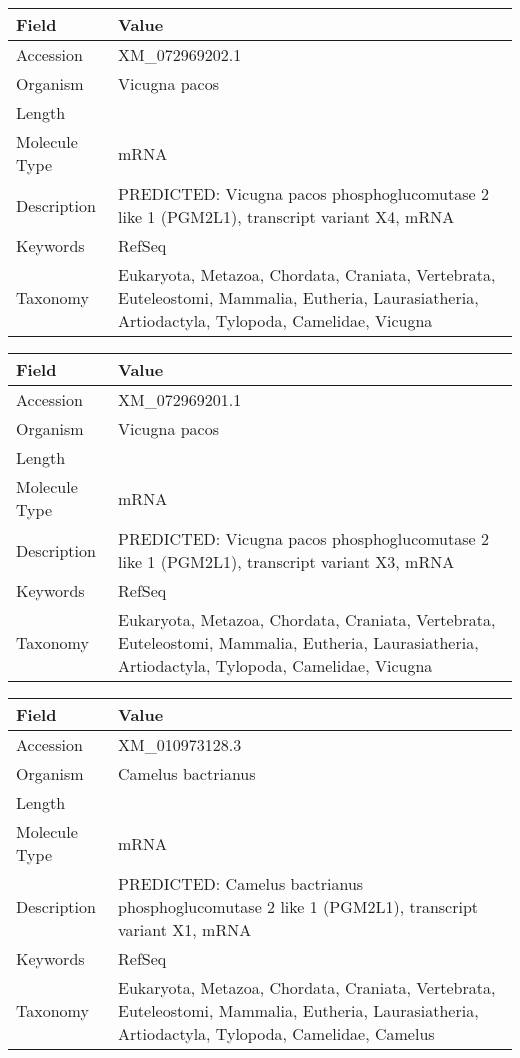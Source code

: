 \documentclass[10pt]{article}
\begin{document}
\vspace{1em}
{\footnotesize
\begin{longtable}{>{\raggedright\arraybackslash}p{4.5cm} >{\raggedright\arraybackslash}p{11.5cm}}
\textbf{Field} & \textbf{Value} \\
\hline
Accession & XM\_072969202.1 \\
Organism & Vicugna pacos \\
Length & 2190 \\
Molecule Type & mRNA \\
Description & PREDICTED: Vicugna pacos phosphoglucomutase 2 like 1 (PGM2L1), transcript variant X4, mRNA \\
Keywords & RefSeq \\
Taxonomy & Eukaryota, Metazoa, Chordata, Craniata, Vertebrata, Euteleostomi, Mammalia, Eutheria, Laurasiatheria, Artiodactyla, Tylopoda, Camelidae, Vicugna \\
\end{longtable}
}

\vspace{1em}
{\footnotesize
\begin{longtable}{>{\raggedright\arraybackslash}p{4.5cm} >{\raggedright\arraybackslash}p{11.5cm}}
\textbf{Field} & \textbf{Value} \\
\hline
Accession & XM\_072969201.1 \\
Organism & Vicugna pacos \\
Length & 2433 \\
Molecule Type & mRNA \\
Description & PREDICTED: Vicugna pacos phosphoglucomutase 2 like 1 (PGM2L1), transcript variant X3, mRNA \\
Keywords & RefSeq \\
Taxonomy & Eukaryota, Metazoa, Chordata, Craniata, Vertebrata, Euteleostomi, Mammalia, Eutheria, Laurasiatheria, Artiodactyla, Tylopoda, Camelidae, Vicugna \\
\end{longtable}
}

\vspace{1em}
{\footnotesize
\begin{longtable}{>{\raggedright\arraybackslash}p{4.5cm} >{\raggedright\arraybackslash}p{11.5cm}}
\textbf{Field} & \textbf{Value} \\
\hline
Accession & XM\_010973128.3 \\
Organism & Camelus bactrianus \\
Length & 6990 \\
Molecule Type & mRNA \\
Description & PREDICTED: Camelus bactrianus phosphoglucomutase 2 like 1 (PGM2L1), transcript variant X1, mRNA \\
Keywords & RefSeq \\
Taxonomy & Eukaryota, Metazoa, Chordata, Craniata, Vertebrata, Euteleostomi, Mammalia, Eutheria, Laurasiatheria, Artiodactyla, Tylopoda, Camelidae, Camelus \\
\end{longtable}
}
\end{document}
